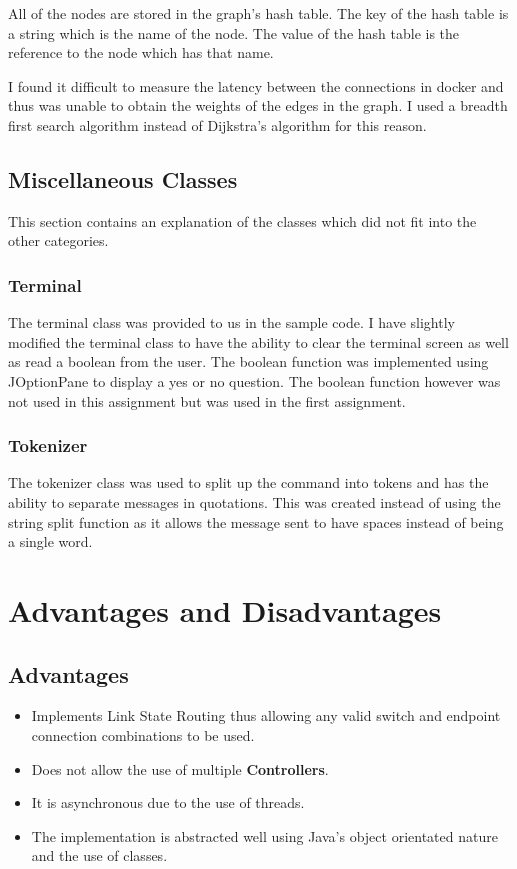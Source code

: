 \documentclass{article}
\begin{document}
All of the nodes are stored in the graph's hash table. The key of the hash
table is a string which is the name of the node. The value of the hash table is
the reference to the node which has that name.

I found it difficult to measure the latency between the connections in docker
and thus was unable to obtain the weights of the edges in the graph. I used a
breadth first search algorithm instead of Dijkstra's algorithm for this reason.

\subsection{Miscellaneous Classes}
This section contains an explanation of the classes which did not fit into the
other categories.

\subsubsection{Terminal}
The terminal class was provided to us in the sample code. I have slightly
modified the terminal class to have the ability to clear the terminal screen
as well as read a boolean from the user. The boolean function was implemented
using JOptionPane to display a yes or no question. The boolean function however
was not used in this assignment but was used in the first assignment.

\subsubsection{Tokenizer}
The tokenizer class was used to split up the command into tokens and has the
ability to separate messages in quotations. This was created instead of using
the string split function as it allows the message sent to have spaces instead
of being a single word.

\section{Advantages and Disadvantages}
\subsection{Advantages}
\begin{itemize}
  \item{Implements Link State Routing thus allowing any valid switch and
    endpoint connection combinations to be used.}
  \item{Does not allow the use of multiple \textbf{Controllers}.}
  \item{It is asynchronous due to the use of threads.}
  \item{The implementation is abstracted well using Java's object orientated
    nature and the use of classes.}
\end{itemize}
\end{document}
